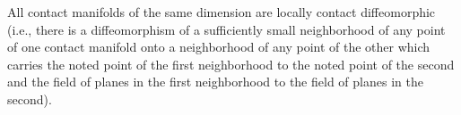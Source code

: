 All contact manifolds of the same dimension are locally contact diffeomorphic (i.e., there is a diffeomorphism of a sufficiently small neighborhood of any point of one contact manifold onto a neighborhood of any point of the other which carries the noted point of the first neighborhood to the noted point of the second and the field of planes in the first neighborhood to the field of planes in the second).
